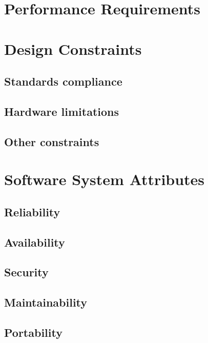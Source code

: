 	\section{Performance Requirements}
	\section{Design Constraints}
		\subsection{Standards compliance}
		\subsection{Hardware limitations}
		\subsection{Other constraints}
	\section{Software System Attributes}
		\subsection{Reliability}
		\subsection{Availability}
		\subsection{Security}
		\subsection{Maintainability}
		\subsection{Portability}